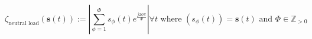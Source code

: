 \begin{equation}
	\zeta_\text{neutral load}(\textbf{s}(t)) := \left|\sum_{\phi=1}^{\Phi} s_\phi(t)e^{\frac{j2\phi\pi}{\Phi}}\right| \forall t \text{ where } (s_\phi(t)) = \textbf{s}(t) \text{ and } \Phi \in \mathbb{Z}_{>0}
\label{ch1:equ:neutral-load}
\end{equation}